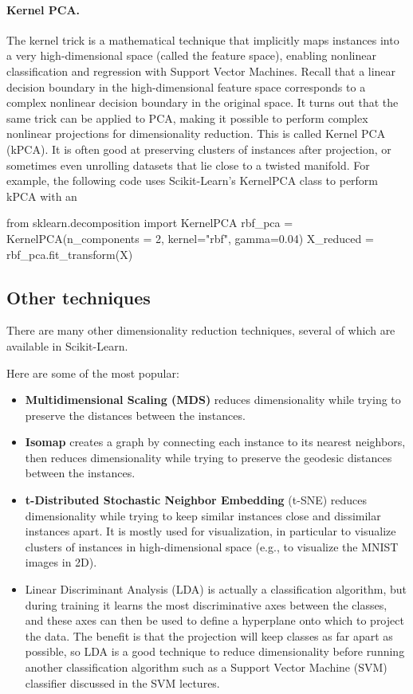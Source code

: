 \documentclass[%
oneside,                 %
final,                   %
10pt]{article}
\begin{document}
\paragraph{Kernel PCA.}
The kernel trick is a mathematical technique that implicitly maps instances into a
very high-dimensional space (called the feature space), enabling nonlinear classification and regression
with Support Vector Machines. Recall that a linear decision boundary in the high-dimensional feature
space corresponds to a complex nonlinear decision boundary in the original space.
It turns out that the same trick can be applied to PCA, making it possible to perform complex nonlinear
projections for dimensionality reduction. This is called Kernel PCA (kPCA). It is often good at
preserving clusters of instances after projection, or sometimes even unrolling datasets that lie close to a
twisted manifold.
For example, the following code uses Scikit-Learn’s KernelPCA class to perform kPCA with an




\bpycod
from sklearn.decomposition import KernelPCA
rbf_pca = KernelPCA(n_components = 2, kernel="rbf", gamma=0.04)
X_reduced = rbf_pca.fit_transform(X)

\epycod


\subsection{Other techniques}

There are many other dimensionality reduction techniques, several of which are available in Scikit-Learn.

Here are some of the most popular:
\begin{itemize}
\item \textbf{Multidimensional Scaling (MDS)} reduces dimensionality while trying to preserve the distances between the instances.

\item \textbf{Isomap} creates a graph by connecting each instance to its nearest neighbors, then reduces dimensionality while trying to preserve the geodesic distances between the instances.

\item \textbf{t-Distributed Stochastic Neighbor Embedding} (t-SNE) reduces dimensionality while trying to keep similar instances close and dissimilar instances apart. It is mostly used for visualization, in particular to visualize clusters of instances in high-dimensional space (e.g., to visualize the MNIST images in 2D).

\item Linear Discriminant Analysis (LDA) is actually a classification algorithm, but during training it learns the most discriminative axes between the classes, and these axes can then be used to define a hyperplane onto which to project the data. The benefit is that the projection will keep classes as far apart as possible, so LDA is a good technique to reduce dimensionality before running another classification algorithm such as a Support Vector Machine (SVM) classifier discussed in the SVM lectures.
\end{itemize}

\noindent


\end{document}
